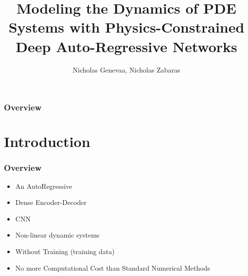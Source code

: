 \documentclass{beamer}
\title[CVRG SUMMER 2021 PDE with NNs]{Modeling the Dynamics of PDE Systems with
Physics-Constrained Deep Auto-Regressive Networks} %
\author{Nicholas Genevaa, Nicholas Zabaras} %
\institute[UND] %
{
University of Notre Dame\\ %
\medskip
\textit{ngeneva@nd.edu} %
\textit{nzabaras@nd.edu}
\footnote{Code available at: \href{https://github.com/cics-nd/ar-pde-cnn}{https://github.com/cics-nd/ar-pde-cnn}.}
}
\theoremstyle{remark}
\begin{document}
\begin{frame}
\titlepage %
\end{frame}

\begin{frame}
\frametitle{Overview} %
\tableofcontents %
\end{frame}


\section{Introduction} %

\begin{frame}
\frametitle{Overview}
\begin{itemize}
\item An AutoRegressive
\item Dense Encoder-Decoder
\item CNN
\item Non-linear dynamic systems
\item Without Training (training data)
\item No more Computational Cost than Standard Numerical Methods

\end{itemize}
\end{frame}
\end{document}
